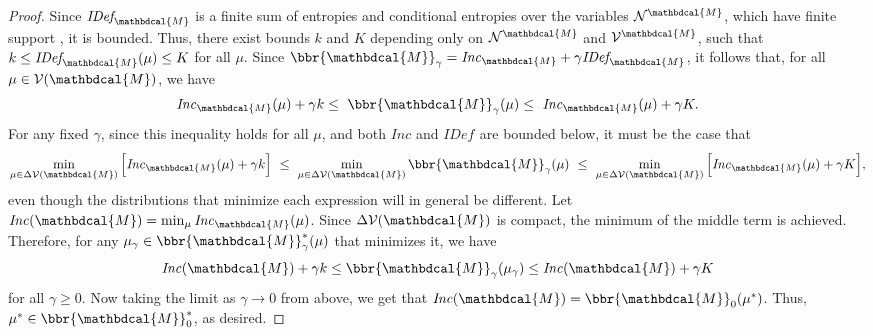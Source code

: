 \documentclass[letterpaper]{article} %
\theoremstyle{plain}
\theoremstyle{definition}
\theoremstyle{remark}
\newcommand{\commentout}[1]{\ignorespaces}
\newcommand{\V}{\mathcal V}
\newcommand{\N}{\mathcal N}
\newcommand{\dg}[1]{\mathbdcal{#1}}
\newcommand{\IDef}[1]{\mathit{IDef}_{\!#1}}
\newcommand\Inc{\mathit{Inc}}
\begin{document}
\begin{proof}
\def\lb{k}
\def\ub{K}  

Since $\IDef{\dg M}$ is a finite sum of entropies
and conditional entropies over the variables $\N^{\dg M}$, which have finite support%
, it is bounded.
Thus, there exist bounds $k$ and $K$ depending only on $\N^{\dg M}$ and
$\V^{\dg M}$, such that $\lb \leq \IDef{\dg M}(\mu) \leq \ub$ for all $\mu$.
%
Since $\bbr{\dg M}_\gamma = \Inc_{\dg M} + \gamma \IDef{\dg M}$,
it follows that, for all $\mu \in \V(\dg M)$, we have
\[ \Inc_{\dg M}( \mu) + \gamma\lb \leq~ \bbr{\dg M }_\gamma(\mu) 
\leq~  \Inc_{\dg M}( \mu) + \gamma\ub. \]
For any fixed $\gamma$, since this inequality holds for all $\mu$, and
both $\Inc$ and $\IDef{}$ are bounded below, it must be the case that  
\[
\min_{\mu \in \Delta\V(\dg M)} \Big[ \Inc_{\dg M}( \mu) + \gamma\lb \Big]
~\leq~ \min_{\mu \in \Delta\V(\dg M)}\bbr{\dg M }_\gamma(\mu) ~\leq~
\min_{\mu \in \Delta\V(\dg M)} \Big[ \Inc_{\dg M}( \mu) + \gamma\ub
    \Big], \] 
even though the distributions that minimize each expression will in general be different.
Let $\Inc(\dg M) = \min_{\mu} \Inc_{\dg M}(\mu)$.
Since $\Delta\V(\dg M)$ is compact, the minimum of the middle term is
achieved.  
Therefore, for any $\mu_\gamma \in \bbr{\dg M}^*_\gamma(\mu)$ that minimizes it, we have
$$\Inc(\dg M) +\gamma \lb \le \bbr{\dg M }_\gamma(\mu_\gamma) \le
		 \Inc(\dg M) +\gamma \ub$$ for all $\gamma \ge 0.$
Now taking the limit as $\gamma\rightarrow 0$ from above, we get that
$\Inc(\dg M) = \bbr{\dg M }_0(\mu^*)$.
Thus, $\mu^* \in \bbr{\dg M}_0^*$, as desired.
\commentout{

}
\end{proof}
\end{document}
